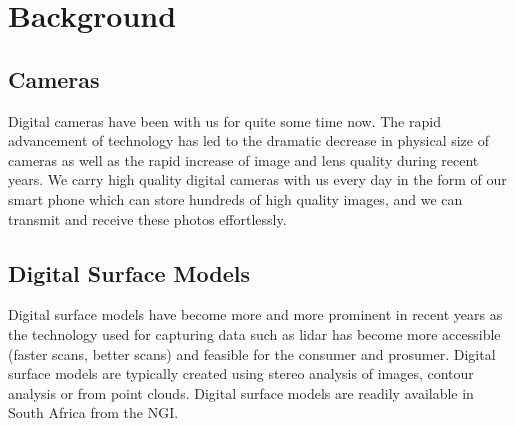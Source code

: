

\section{Background}
\subsection{Cameras}
Digital cameras have been with us for quite some time now. 
The rapid advancement of technology has led to the dramatic decrease in physical size of cameras 
as well as the rapid increase of image and lens quality during recent years. 
We carry high quality digital cameras with us every day in the form of our smart phone which can store 
hundreds of high quality images, and we can transmit and receive these photos effortlessly.

\subsection{Digital Surface Models}
Digital surface models have become more and more prominent in recent years as the technology used for 
capturing data such as lidar has become more accessible (faster scans, better scans) and feasible for 
the consumer and prosumer. 
Digital surface models are typically created using stereo analysis of images, contour analysis or from point clouds. 
Digital surface models are readily available in South Africa from the NGI.